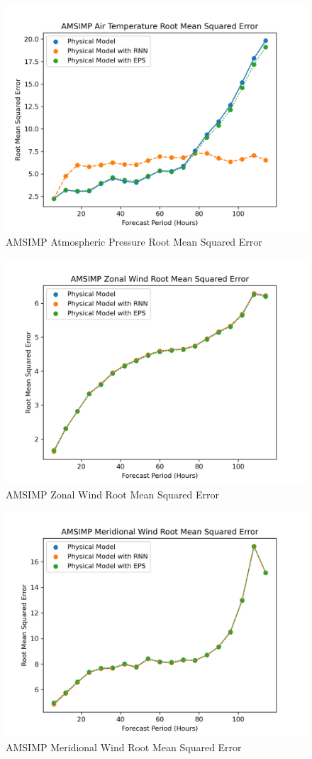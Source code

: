 \begin{appendices}
    \begin{figure}[H]
        \centering
        \includegraphics[width=.7\linewidth]{Graphs/accuracy/appendices/amsimp/geopotential_height/root_mean_squared_error.png}
        \caption{AMSIMP Atmospheric Pressure Root Mean Squared Error}
    \end{figure}
    
    \begin{figure}[H]
        \centering
        \includegraphics[width=.7\linewidth]{Graphs/accuracy/appendices/amsimp/zonal_wind/root_mean_squared_error.png}
        \caption{AMSIMP Zonal Wind Root Mean Squared Error}
    \end{figure}
    
    \begin{figure}[H]
        \centering
        \includegraphics[width=.7\linewidth]{Graphs/accuracy/appendices/amsimp/meridional_wind/root_mean_squared_error.png}
        \caption{AMSIMP Meridional Wind Root Mean Squared Error}
    \end{figure}
    

\end{appendices}
